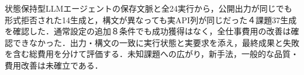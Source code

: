 状態保持型LLMエージェントの保存文脈と全24実行から，公開出力が同じでも形式拒否された14生成と，構文が異なっても実API列が同じだった４課題37生成を確認した．通常設定の追加８条件でも成功獲得はなく，全仕事費用の改善は確認できなかった．出力・構文の一致に実行状態と実要求を添え，最終成果と失敗を含む総費用を分けて評価する．未知課題への広がり，新手法，一般的な品質・費用改善は未確立である．
